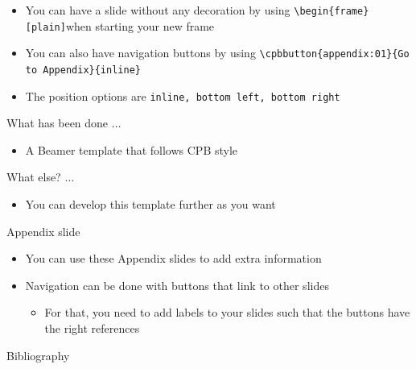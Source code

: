 



\begin{frame}
\label{slide:label_to_frame}
    \begin{itemize}
        \item You can have a slide without any decoration by using \verb|\begin{frame}[plain]|when starting your new frame
        \item You can also have navigation buttons by using \verb|\cpbbutton{appendix:01}{Go to Appendix}{inline}| 
        \item The position options are \verb|inline, bottom left, bottom right|
    \end{itemize}
\end{frame}




\begin{frame}
\begin{block}{What has been done $\ldots$}
    \begin{itemize}
        \item A Beamer template that follows CPB style
    \end{itemize}
\end{block}
\pause
\begin{block}{What else? $\ldots$}
    \begin{itemize}
        \item You can develop this template further as you want
    \end{itemize}
\end{block}   
\end{frame}


\cpbeindframe



\begin{frame}[noframenumbering]{Appendix slide}
\label{appendix:01}
 \begin{itemize}
     \item You can use these Appendix slides to add extra information
     \item Navigation can be done with buttons that link to other slides
        \begin{itemize}
            \item For that, you need to add labels to your slides such that the buttons have the right references
        \end{itemize}
 \end{itemize}
\end{frame}



\begin{frame}[noframenumbering,allowframebreaks=0.75]{Bibliography}
        
        
\end{frame}




